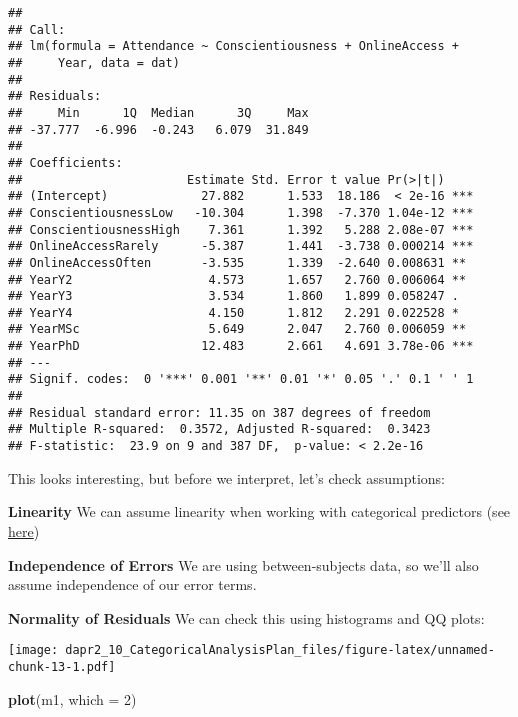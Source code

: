 \documentclass[
]{article}
\newenvironment{Shaded}{\begin{snugshade}}{\end{snugshade}}
\newcommand{\AttributeTok}[1]{\textcolor[rgb]{0.13,0.29,0.53}{#1}}
\newcommand{\DecValTok}[1]{\textcolor[rgb]{0.00,0.00,0.81}{#1}}
\newcommand{\FunctionTok}[1]{\textcolor[rgb]{0.13,0.29,0.53}{\textbf{#1}}}
\newcommand{\NormalTok}[1]{#1}
\newcommand{\SpecialCharTok}[1]{\textcolor[rgb]{0.81,0.36,0.00}{\textbf{#1}}}
\begin{document}
\begin{verbatim}
## 
## Call:
## lm(formula = Attendance ~ Conscientiousness + OnlineAccess + 
##     Year, data = dat)
## 
## Residuals:
##     Min      1Q  Median      3Q     Max 
## -37.777  -6.996  -0.243   6.079  31.849 
## 
## Coefficients:
##                       Estimate Std. Error t value Pr(>|t|)    
## (Intercept)             27.882      1.533  18.186  < 2e-16 ***
## ConscientiousnessLow   -10.304      1.398  -7.370 1.04e-12 ***
## ConscientiousnessHigh    7.361      1.392   5.288 2.08e-07 ***
## OnlineAccessRarely      -5.387      1.441  -3.738 0.000214 ***
## OnlineAccessOften       -3.535      1.339  -2.640 0.008631 ** 
## YearY2                   4.573      1.657   2.760 0.006064 ** 
## YearY3                   3.534      1.860   1.899 0.058247 .  
## YearY4                   4.150      1.812   2.291 0.022528 *  
## YearMSc                  5.649      2.047   2.760 0.006059 ** 
## YearPhD                 12.483      2.661   4.691 3.78e-06 ***
## ---
## Signif. codes:  0 '***' 0.001 '**' 0.01 '*' 0.05 '.' 0.1 ' ' 1
## 
## Residual standard error: 11.35 on 387 degrees of freedom
## Multiple R-squared:  0.3572, Adjusted R-squared:  0.3423 
## F-statistic:  23.9 on 9 and 387 DF,  p-value: < 2.2e-16
\end{verbatim}

This looks interesting, but before we interpret, let's check assumptions:

\textbf{Linearity}
We can assume linearity when working with categorical predictors (see \href{https://www.bookdown.org/rwnahhas/RMPH/mlr-linearity.html}{here})

\textbf{Independence of Errors}
We are using between-subjects data, so we'll also assume independence of our error terms.

\textbf{Normality of Residuals}
We can check this using histograms and QQ plots:

\begin{Shaded}
\end{Shaded}

\texttt{[image: dapr2\_10\_CategoricalAnalysisPlan\_files/figure-latex/unnamed-chunk-13-1.pdf]}

\begin{Shaded}
\begin{Highlighting}[]
\FunctionTok{plot}\NormalTok{(m1, }\AttributeTok{which =} \DecValTok{2}\NormalTok{)}
\end{Highlighting}
\end{Shaded}
\end{document}
